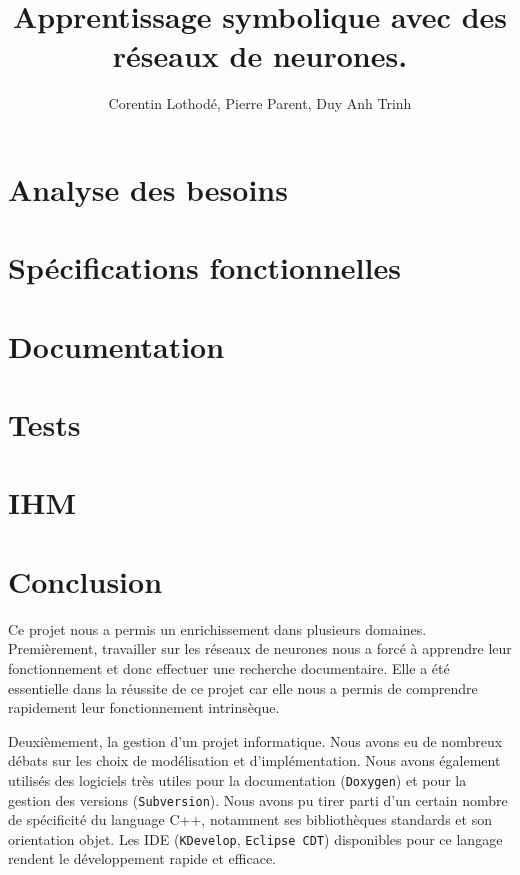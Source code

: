 \documentclass[11pt,a4paper]{report}
\title{Apprentissage symbolique avec des r\'eseaux de neurones.}
\author{Corentin Lothod\'e, Pierre Parent, Duy Anh Trinh}
\begin{document}
\maketitle

\tableofcontents

\chapter{Analyse des besoins}
	
	
	

\chapter{Sp\'ecifications fonctionnelles}
	
	
	
	
	

\chapter{Documentation}


\chapter{Tests}
	

\chapter{IHM}
	

\chapter*{Conclusion}
Ce projet nous a permis un enrichissement dans plusieurs domaines. Premièrement,  travailler sur les réseaux de neurones nous a forcé à apprendre leur fonctionnement et donc effectuer une recherche documentaire. Elle a été essentielle dans la réussite de ce projet car elle nous a permis de comprendre rapidement leur fonctionnement intrinsèque.

Deuxièmement, la gestion d'un projet informatique. Nous avons eu de nombreux débats sur les choix de modélisation et d'implémentation. Nous avons également utilisés des logiciels très utiles pour la documentation (\texttt{Doxygen}) et pour la gestion des versions (\texttt{Subversion}). Nous avons pu tirer parti d'un certain nombre de spécificité du language C++, notamment ses bibliothèques standards et son orientation objet. Les IDE (\texttt{KDevelop}, \texttt{Eclipse CDT}) disponibles pour ce langage rendent le développement rapide et efficace.
\end{document}
